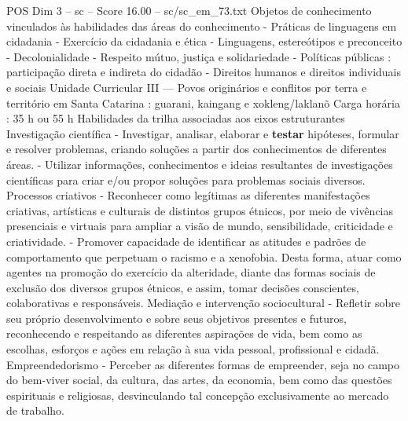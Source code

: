 \begin{textsample}{POS Dim 3 – sc – Score 16.00 – sc/sc\_em\_73.txt}
Objetos de conhecimento vinculados às habilidades das áreas do conhecimento - Práticas de linguagens em cidadania - Exercício da cidadania e ética - Linguagens, estereótipos e preconceito - Decolonialidade - Respeito mútuo, justiça e solidariedade - Políticas públicas : participação direta e indireta do cidadão - Direitos humanos e direitos individuais e sociais Unidade Curricular III — Povos originários e conflitos por terra e território em Santa Catarina : guarani, kaingang e xokleng/laklanõ Carga horária : 35 h ou 55 h Habilidades da trilha associadas aos eixos estruturantes Investigação científica - Investigar, analisar, elaborar e \textbf{testar} hipóteses, formular e resolver problemas, criando soluções a partir dos conhecimentos de diferentes áreas. - Utilizar informações, conhecimentos e ideias resultantes de investigações científicas para criar e/ou propor soluções para problemas sociais diversos.
Processos criativos - Reconhecer como legítimas as diferentes manifestações criativas, artísticas e culturais de distintos grupos étnicos, por meio de vivências presenciais e virtuais para ampliar a visão de mundo, sensibilidade, criticidade e criatividade. - Promover capacidade de identificar as atitudes e padrões de comportamento que perpetuam o racismo e a xenofobia.
Desta forma, atuar como agentes na promoção do exercício da alteridade, diante das formas sociais de exclusão dos diversos grupos étnicos, e assim, tomar decisões conscientes, colaborativas e responsáveis.
Mediação e intervenção sociocultural - Refletir sobre seu próprio desenvolvimento e sobre seus objetivos presentes e futuros, reconhecendo e respeitando as diferentes aspirações de vida, bem como as escolhas, esforços e ações em relação à sua vida pessoal, profissional e cidadã.
Empreendedorismo - Perceber as diferentes formas de empreender, seja no campo do bem-viver social, da cultura, das artes, da economia, bem como das questões espirituais e religiosas, desvinculando tal concepção exclusivamente ao mercado de trabalho.

\end{textsample}
